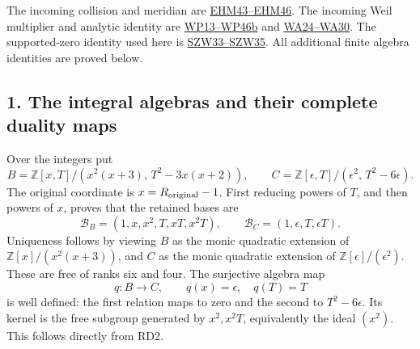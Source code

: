 \documentclass[
  10pt,
  a4paper,
]{article}
\begin{document}
The incoming collision and meridian are
\href{https://github.com/KokunoYumeto/zeta-function-research-reader/blob/4a4238afc992e77aee83b97d38a1a63d283f540c/workbenches/splitzero-tandem/branches/tau-zero-prime-positivity/EIGHT_STATE_HOLONOMY_DERIVATION.md}{EHM43--EHM46}.
The incoming Weil multiplier and analytic identity are
\href{https://github.com/KokunoYumeto/zeta-function-research-reader/blob/4a4238afc992e77aee83b97d38a1a63d283f540c/workbenches/splitzero-tandem/branches/tau-zero-prime-positivity/WEIL_PACKET_DERIVATION.md}{WP13--WP46b}
and
\href{https://github.com/KokunoYumeto/zeta-function-research-reader/blob/4a4238afc992e77aee83b97d38a1a63d283f540c/workbenches/splitzero-tandem/branches/tau-zero-prime-positivity/WEIL_PACKET_ANALYTIC_DERIVATION.md}{WA24--WA30}.
The supported-zero identity used here is
\href{https://github.com/KokunoYumeto/zeta-function-research-reader/blob/4a4238afc992e77aee83b97d38a1a63d283f540c/workbenches/splitzero-tandem/branches/tau-zero-prime-positivity/SUPPORTED_ZERO_PRIME_WEIL_DERIVATION.md}{SZW33--SZW35}.
All additional finite algebra identities are proved below.

\subsection{1. The integral algebras and their complete duality
maps}\label{the-integral-algebras-and-their-complete-duality-maps}

Over the integers put \[
B=\mathbb Z[x,T]/(x^2(x+3),\,T^2-3x(x+2)),\qquad
C=\mathbb Z[\epsilon,T]/(\epsilon^2,\,T^2-6\epsilon).
\tag{RD1}
\] The original coordinate is \(x=R_{\rm original}-1\). First reducing
powers of \(T\), and then powers of \(x\), proves that the retained
bases are \[
\mathcal B_B=(1,x,x^2,T,xT,x^2T),\qquad
\mathcal B_C=(1,\epsilon,T,\epsilon T).
\tag{RD2}
\] Uniqueness follows by viewing \(B\) as the monic quadratic extension
of \(\mathbb Z[x]/(x^2(x+3))\), and \(C\) as the monic quadratic
extension of \(\mathbb Z[\epsilon]/(\epsilon^2)\). These are free of
ranks six and four. The surjective algebra map \[
q:B\longrightarrow C,\qquad q(x)=\epsilon,\quad q(T)=T
\tag{RD3}
\] is well defined: the first relation maps to zero and the second to
\(T^2-6\epsilon\). Its kernel is the free subgroup generated by
\(x^2,x^2T\), equivalently the ideal \((x^2)\). This follows directly
from RD2.
\end{document}
